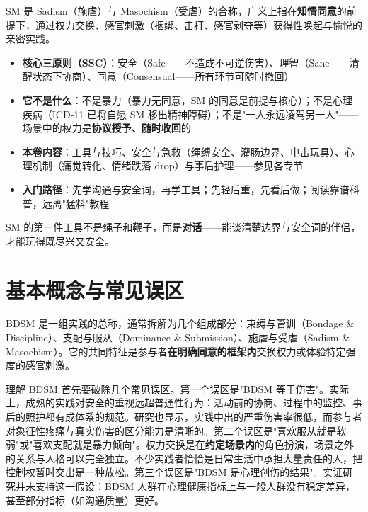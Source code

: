 \documentclass[12pt,UTF8]{ctexbook}
\newcommand{\keyword}[1]{\textbf{#1}}
\begin{document}
SM 是 Sadism（施虐）与 Masochism（受虐）的合称，广义上指在\textbf{知情同意}的前提下，通过权力交换、感官刺激（捆绑、击打、感官剥夺等）获得性唤起与愉悦的亲密实践。

\begin{itemize}
\item \textbf{核心三原则（SSC）}：安全（Safe——不造成不可逆伤害）、理智（Sane——清醒状态下协商）、同意（Consensual——所有环节可随时撤回）
\item \textbf{它不是什么}：不是暴力（暴力无同意，SM 的同意是前提与核心）；不是心理疾病（ICD-11\cite{who2019icd11} 已将自愿 SM 移出精神障碍\citep{who2019icd11}）；不是"一人永远凌驾另一人"——场景中的权力是\textbf{协议授予、随时收回}的
\item \textbf{本卷内容}：工具与技巧、安全与急救（绳缚安全、灌肠边界、电击玩具）、心理机制（痛觉转化、情绪跌落 drop）与事后护理——参见各专节
\item \textbf{入门路径}：先学沟通与安全词，再学工具；先轻后重，先看后做；阅读靠谱科普，远离"猛料"教程
\end{itemize}

\begin{tcolorbox}[colback=pink!5!white,colframe=red!50!black,title=核心原则]
SM 的第一件工具不是绳子和鞭子，而是\textbf{对话}——能谈清楚边界与安全词的伴侣，才能玩得既尽兴又安全。
\end{tcolorbox}

\section{基本概念与常见误区}

BDSM 是一组实践的总称，通常拆解为几个组成部分：束缚与管训（Bondage \& Discipline）、支配与服从（Dominance \& Submission）、施虐与受虐（Sadism \& Masochism）。它的共同特征是参与者\keyword{在明确同意的框架内}交换权力或体验特定强度的感官刺激。

理解 BDSM 首先要破除几个常见误区。第一个误区是"BDSM 等于伤害"。实际上，成熟的实践对安全的重视远超普通性行为：活动前的协商、过程中的监控、事后的照护都有成体系的规范。研究也显示，实践中出的严重伤害率很低，而参与者对象征性疼痛与真实伤害的区分能力是清晰的。第二个误区是"喜欢服从就是软弱"或"喜欢支配就是暴力倾向"。权力交换是在\keyword{约定场景内}的角色扮演，场景之外的关系与人格可以完全独立。不少实践者恰恰是日常生活中承担大量责任的人，把控制权暂时交出是一种放松。第三个误区是"BDSM 是心理创伤的结果"。实证研究并未支持这一假设：BDSM 人群在心理健康指标上与一般人群没有稳定差异，甚至部分指标（如沟通质量）更好。
\end{document}
